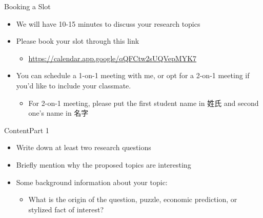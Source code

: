\documentclass[dvipsnames,hyperref={pdfpagelabels=false}]{beamer}
\begin{document}
\begin{frame}{Booking a Slot}
	\begin{itemize} 
	
		\item We will have 10-15 minutes to discuss your research topics
		\vspace{0.2cm}
		\item Please book your slot through this link
		\vspace{0.2cm}
		\begin{itemize} 
			\item \url{https://calendar.app.google/qQFCtw2sUQVepMYK7}
			
		\end{itemize}
		\vspace{0.2cm}
		\item You can schedule a 1-on-1 meeting with me, or opt for a 2-on-1 meeting if you'd like to include your classmate. 
	\vspace{0.2cm}
	\begin{itemize} 
		\item For 2-on-1 meeting, please put the first student name in 姓氏 and second one's name in 名字
		
	\end{itemize}
		\vspace{0.2cm}
			
		
	\end{itemize}
\end{frame}







\begin{frame}{Content}{Part 1}
	\begin{itemize} 
		\item Write down at least two research questions
		\vspace{0.2cm}
		\item Briefly mention why the proposed topics are interesting 
		\vspace{0.2cm}
		\item Some background information about your topic: 
		\vspace{0.2cm}
		\begin{itemize}
			\item What is the origin of the question, puzzle, economic prediction, or stylized fact of interest?
		\end{itemize}
		
		
		
		
	\end{itemize}
\end{frame}
\end{document}
